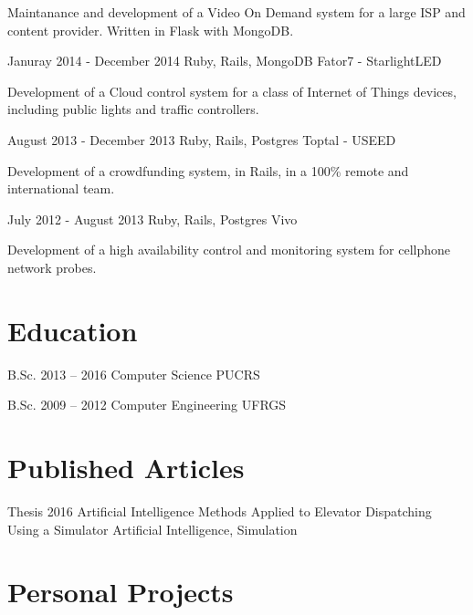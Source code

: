 \documentclass{tccv}
\begin{document}
\begin{eventlist}
      Maintanance and development of a Video On Demand system for a large ISP and
      content provider. Written in Flask with MongoDB.

    \item{Januray 2014 - December 2014}
      {Ruby, Rails, MongoDB}
      {Fator7 - StarlightLED}

      Development of a Cloud control system for a class of Internet of Things devices,
      including public lights and traffic controllers.

    \item{August 2013 - December 2013}
      {Ruby, Rails, Postgres}
      {Toptal - USEED}

      Development of a crowdfunding system, in Rails, in a 100\% remote and
      international team.

    \item{July 2012 - August 2013}
      {Ruby, Rails, Postgres}
      {Vivo}
      
      Development of a high availability control and monitoring system for cellphone
      network probes.

    \end{eventlist}

    \section{Education}

    \begin{yearlist}

    \item[B.Sc.]{2013 -- 2016}
      {Computer Science}
      {PUCRS}

    \item[B.Sc.]{2009 -- 2012}
      {Computer Engineering}
      {UFRGS}

    \end{yearlist}

    \section{Published Articles}
    \begin{yearlist}
    \item[Thesis]{2016}
      {Artificial Intelligence Methods Applied to Elevator Dispatching Using a Simulator}
      {Artificial Intelligence, Simulation}
    \end{yearlist}

    \section{Personal Projects}
\end{document}
